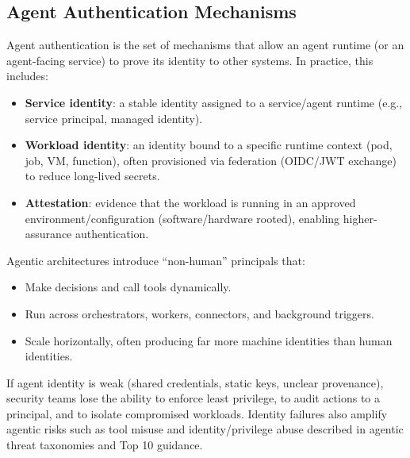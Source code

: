 

\begin{TNtwocol}
    \section{Agent Authentication Mechanisms }

    Agent authentication is the set of mechanisms that allow an agent runtime (or an agent-facing service) to prove its identity to other systems. In practice, this includes:

    \begin{itemize}
        \item \textbf{Service identity}: a stable identity assigned to a service/agent runtime (e.g., service principal, managed identity).
        \item \textbf{Workload identity}: an identity bound to a specific runtime context (pod, job, VM, function), often provisioned via federation (OIDC/JWT exchange) to reduce long-lived secrets.
        \item \textbf{Attestation}: evidence that the workload is running in an approved environment/configuration (software/hardware rooted), enabling higher-assurance authentication.
    \end{itemize}

    Agentic architectures introduce “non-human” principals that:
    \begin{itemize}
        \item Make decisions and call tools dynamically.
        \item Run across orchestrators, workers, connectors, and background triggers.
        \item Scale horizontally, often producing far more machine identities than human identities.
    \end{itemize}

    If agent identity is weak (shared credentials, static keys, unclear provenance), security teams lose the ability to enforce least privilege, to audit actions to a principal, and to isolate compromised workloads. Identity failures also amplify agentic risks such as tool misuse and identity/privilege abuse described in agentic threat taxonomies and Top 10 guidance.


\end{TNtwocol}

